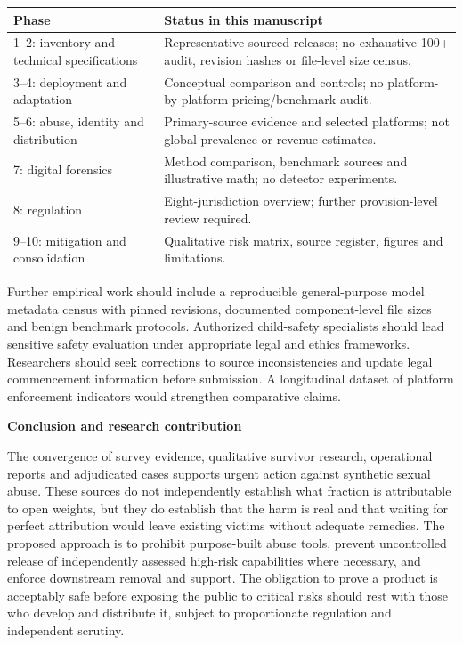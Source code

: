 \documentclass[10pt,a4paper]{article}
\newcommand{\sub}[1]{\vspace{1mm}\textbf{#1}\par}
\begin{document}
\begin{center}\small\begin{tabularx}{\linewidth}{@{}YY@{}}\toprule
\textbf{Phase} & \textbf{Status in this manuscript}\\--2: inventory and technical specifications & Representative sourced releases; no exhaustive 100+ audit, revision hashes or file-level size census.\\
3--4: deployment and adaptation & Conceptual comparison and controls; no platform-by-platform pricing/benchmark audit.\\
5--6: abuse, identity and distribution & Primary-source evidence and selected platforms; not global prevalence or revenue estimates.\\
7: digital forensics & Method comparison, benchmark sources and illustrative math; no detector experiments.\\
8: regulation & Eight-jurisdiction overview; further provision-level review required.\\
9--10: mitigation and consolidation & Qualitative risk matrix, source register, figures and limitations.\\\bottomrule\end{tabularx}\end{center}

Further empirical work should include a reproducible general-purpose model metadata census with pinned revisions, documented component-level file sizes and benign benchmark protocols. Authorized child-safety specialists should lead sensitive safety evaluation under appropriate legal and ethics frameworks. Researchers should seek corrections to source inconsistencies and update legal commencement information before submission. A longitudinal dataset of platform enforcement indicators would strengthen comparative claims.


\sub{Conclusion and research contribution}
The convergence of survey evidence, qualitative survivor research, operational reports and adjudicated cases supports urgent action against synthetic sexual abuse. These sources do not independently establish what fraction is attributable to open weights, but they do establish that the harm is real and that waiting for perfect attribution would leave existing victims without adequate remedies. The proposed approach is to prohibit purpose-built abuse tools, prevent uncontrolled release of independently assessed high-risk capabilities where necessary, and enforce downstream removal and support. The obligation to prove a product is acceptably safe before exposing the public to critical risks should rest with those who develop and distribute it, subject to proportionate regulation and independent scrutiny.
\end{document}
